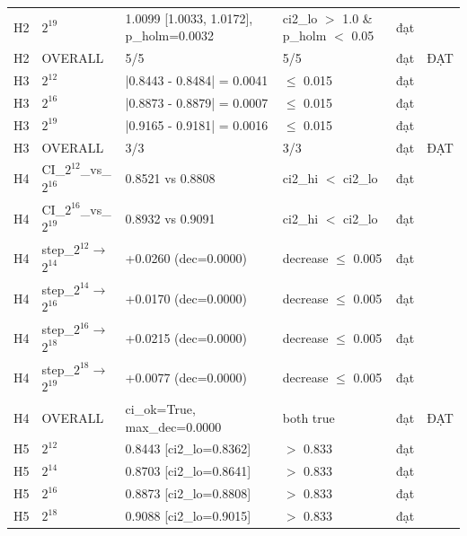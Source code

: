 \begin{longtable}{p{0.8cm}p{2.2cm}p{3.9cm}p{3.2cm}p{1.1cm}p{2.4cm}}
H2 & $2^{19}$ & 1.0099 [1.0033, 1.0172], p\_\allowbreak{}holm=\allowbreak{}0.0032 & ci2\_\allowbreak{}lo $>$\allowbreak{} 1.0 \& p\_\allowbreak{}holm $<$\allowbreak{} 0.05 & đạt &  \\
H2 & OVERALL & 5/5 & 5/5 & đạt & ĐẠT \\
H3 & $2^{12}$ & |0.8443 - 0.8484| =\allowbreak{} 0.0041 & $\le$\allowbreak{} 0.015 & đạt &  \\
H3 & $2^{16}$ & |0.8873 - 0.8879| =\allowbreak{} 0.0007 & $\le$\allowbreak{} 0.015 & đạt &  \\
H3 & $2^{19}$ & |0.9165 - 0.9181| =\allowbreak{} 0.0016 & $\le$\allowbreak{} 0.015 & đạt &  \\
H3 & OVERALL & 3/3 & 3/3 & đạt & ĐẠT \\
H4 & CI\_\allowbreak{}$2^{12}$\_\allowbreak{}vs\_\allowbreak{}$2^{16}$ & 0.8521 vs 0.8808 & ci2\_\allowbreak{}hi $<$\allowbreak{} ci2\_\allowbreak{}lo & đạt &  \\
H4 & CI\_\allowbreak{}$2^{16}$\_\allowbreak{}vs\_\allowbreak{}$2^{19}$ & 0.8932 vs 0.9091 & ci2\_\allowbreak{}hi $<$\allowbreak{} ci2\_\allowbreak{}lo & đạt &  \\
H4 & step\_\allowbreak{}$2^{12}${}$\to${}$2^{14}$ & +0.0260 (dec=\allowbreak{}0.0000) & decrease $\le$\allowbreak{} 0.005 & đạt &  \\
H4 & step\_\allowbreak{}$2^{14}${}$\to${}$2^{16}$ & +0.0170 (dec=\allowbreak{}0.0000) & decrease $\le$\allowbreak{} 0.005 & đạt &  \\
H4 & step\_\allowbreak{}$2^{16}${}$\to${}$2^{18}$ & +0.0215 (dec=\allowbreak{}0.0000) & decrease $\le$\allowbreak{} 0.005 & đạt &  \\
H4 & step\_\allowbreak{}$2^{18}${}$\to${}$2^{19}$ & +0.0077 (dec=\allowbreak{}0.0000) & decrease $\le$\allowbreak{} 0.005 & đạt &  \\
H4 & OVERALL & ci\_\allowbreak{}ok=\allowbreak{}True, max\_\allowbreak{}dec=\allowbreak{}0.0000 & both true & đạt & ĐẠT \\
H5 & $2^{12}$ & 0.8443 [ci2\_\allowbreak{}lo=\allowbreak{}0.8362] & $>$\allowbreak{} 0.833 & đạt &  \\
H5 & $2^{14}$ & 0.8703 [ci2\_\allowbreak{}lo=\allowbreak{}0.8641] & $>$\allowbreak{} 0.833 & đạt &  \\
H5 & $2^{16}$ & 0.8873 [ci2\_\allowbreak{}lo=\allowbreak{}0.8808] & $>$\allowbreak{} 0.833 & đạt &  \\
H5 & $2^{18}$ & 0.9088 [ci2\_\allowbreak{}lo=\allowbreak{}0.9015] & $>$\allowbreak{} 0.833 & đạt &  \\

\end{longtable}
